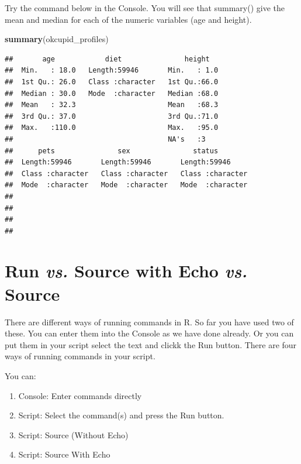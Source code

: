 \documentclass[
]{krantz}
\makeatletter
\newenvironment{Shaded}{\begin{snugshade}}{\end{snugshade}}
\newcommand{\KeywordTok}[1]{\textcolor[rgb]{0.27,0.27,0.27}{\textbf{#1}}}
\newcommand{\NormalTok}[1]{#1}
\providecommand{\tightlist}{%
  \setlength{\itemsep}{0pt}\setlength{\parskip}{0pt}}
\newenvironment{kframe}{%
\medskip{}
\setlength{\fboxsep}{.8em}
 \def\at@end@of@kframe{}%
 \ifinner\ifhmode%
  \def\at@end@of@kframe{\end{minipage}}%
  \begin{minipage}{\columnwidth}%
 \fi\fi%
 \def\FrameCommand##1{\hskip\@totalleftmargin \hskip-\fboxsep
 \colorbox{shadecolor}{##1}\hskip-\fboxsep
     \hskip-\linewidth \hskip-\@totalleftmargin \hskip\columnwidth}%
 \MakeFramed {\advance\hsize-\width
   \@totalleftmargin\z@ \linewidth\hsize
   \@setminipage}}%
 {\par\unskip\endMakeFramed%
 \at@end@of@kframe}
\renewenvironment{Shaded}{\begin{kframe}}{\end{kframe}}
\makeatother
\begin{document}
Try the command below in the Console. You will see that summary() give the mean and median for each of the numeric variables (age and height).

\begin{Shaded}
\begin{Highlighting}[]
\KeywordTok{summary}\NormalTok{(okcupid_profiles)}
\end{Highlighting}
\end{Shaded}

\begin{verbatim}
##       age            diet               height    
##  Min.   : 18.0   Length:59946       Min.   : 1.0  
##  1st Qu.: 26.0   Class :character   1st Qu.:66.0  
##  Median : 30.0   Mode  :character   Median :68.0  
##  Mean   : 32.3                      Mean   :68.3  
##  3rd Qu.: 37.0                      3rd Qu.:71.0  
##  Max.   :110.0                      Max.   :95.0  
##                                     NA's   :3     
##      pets               sex               status         
##  Length:59946       Length:59946       Length:59946      
##  Class :character   Class :character   Class :character  
##  Mode  :character   Mode  :character   Mode  :character  
##                                                          
##                                                          
##                                                          
## 
\end{verbatim}

\hypertarget{run-vs.-source-with-echo-vs.-source}{%
\section{\texorpdfstring{Run \emph{vs.} Source with Echo \emph{vs.} Source}{Run vs. Source with Echo vs. Source}}\label{run-vs.-source-with-echo-vs.-source}}

There are different ways of running commands in R. So far you have used two of these. You can enter them into the Console as we have done already. Or you can put them in your script select the text and clickk the Run button. There are four ways of running commands in your script.

You can:

\begin{enumerate}
\def\labelenumi{\arabic{enumi}.}
\tightlist
\item
  Console: Enter commands directly
\item
  Script: Select the command(s) and press the Run button.
\item
  Script: Source (Without Echo)
\item
  Script: Source With Echo
\end{enumerate}
\end{document}
